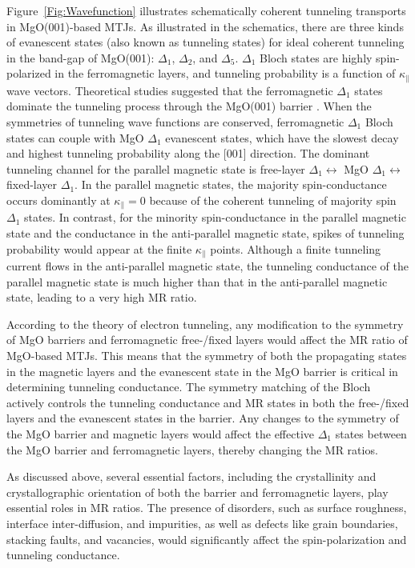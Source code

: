 \documentclass[molecules,review,submit,pdftex,moreauthors]{Definitions/mdpi}
\begin{document}
Figure~\ref{Fig:Wavefunction} illustrates schematically coherent tunneling transports in MgO(001)-based MTJs.  As illustrated in the schematics, there are three kinds of evanescent states (also known as tunneling states) for ideal coherent tunneling in the band-gap of MgO(001): $\Delta_1$, $\Delta_2$, and $\Delta_5$.  $\Delta_1$ Bloch states are highly spin-polarized in the ferromagnetic layers, and tunneling probability is a function of $\kappa_{\parallel}$ wave vectors.  Theoretical studies suggested that the ferromagnetic $\Delta_1$ states dominate the tunneling process through the MgO(001) barrier \cite{Butler2001PRB,Mathon2001PRB}.  When the symmetries of tunneling wave functions are conserved, ferromagnetic $\Delta_1$ Bloch states can couple with MgO $\Delta_1$ evanescent states, which have the slowest decay and highest tunneling probability \cite{Butler2001PRB} along the [001] direction.  The dominant tunneling channel for the parallel magnetic state is free-layer $\Delta_1 \leftrightarrow$ MgO $\Delta_1 \leftrightarrow$ fixed-layer $\Delta_1$.  In the parallel magnetic states, the majority spin-conductance occurs dominantly at $\kappa_{\parallel} = 0$ because of the coherent tunneling of majority spin $\Delta_1$ states.  In contrast, for the minority spin-conductance in the parallel magnetic state and the conductance in the anti-parallel magnetic state, spikes of tunneling probability would appear at the finite $\kappa_{\parallel}$ points.  Although a finite tunneling current flows in the anti-parallel magnetic state, the tunneling conductance of the parallel magnetic state is much higher than that in the anti-parallel magnetic state, leading to a very high MR ratio.


According to the theory of electron tunneling, any modification to the symmetry of MgO barriers and ferromagnetic free-/fixed layers would affect the MR ratio of MgO-based MTJs.  This means that the symmetry of both the propagating states in the magnetic layers and the evanescent state in the MgO barrier is critical in determining tunneling conductance.  The symmetry matching of the Bloch actively controls the tunneling conductance and MR states in both the free-/fixed layers and the evanescent states in the barrier.  Any changes to the symmetry of the MgO barrier and magnetic layers would affect the effective $\Delta_1$ states between the MgO barrier and ferromagnetic layers, thereby changing the MR ratios.  


As discussed above, several essential factors, including the crystallinity and crystallographic orientation of both the barrier and ferromagnetic layers, play essential roles in MR ratios.  The presence of disorders, such as surface roughness, interface inter-diffusion, and impurities, as well as defects like grain boundaries, stacking faults, and vacancies, would significantly affect the spin-polarization and tunneling conductance.  
\end{document}
